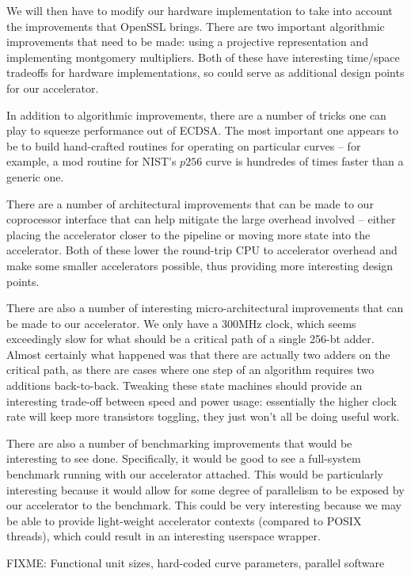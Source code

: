 \documentclass[twocolumn]{article}
\begin{document}
We will then have to modify our hardware implementation to take into
account the improvements that OpenSSL brings.  There are two important
algorithmic improvements that need to be made: using a projective
representation and implementing montgomery multipliers.  Both of these
have interesting time/space tradeoffs for hardware implementations, so
could serve as additional design points for our accelerator.

In addition to algorithmic improvements, there are a number of tricks
one can play to squeeze performance out of ECDSA.  The most important
one appears to be to build hand-crafted routines for operating on
particular curves -- for example, a mod routine for NIST's $p256$
curve is hundredes of times faster than a generic
one\cite{nist-routines}.

There are a number of architectural improvements that can be made to
our coprocessor interface that can help mitigate the large overhead
involved -- either placing the accelerator closer to the pipeline or
moving more state into the accelerator.  Both of these lower the
round-trip CPU to accelerator overhead and make some smaller
accelerators possible, thus providing more interesting design points.

There are also a number of interesting micro-architectural
improvements that can be made to our accelerator.  We only have a
300MHz clock, which seems exceedingly slow for what should be a
critical path of a single 256-bt adder.  Almost certainly what
happened was that there are actually two adders on the critical path,
as there are cases where one step of an algorithm requires two
additions back-to-back.  Tweaking these state machines should provide
an interesting trade-off between speed and power usage: essentially
the higher clock rate will keep more transistors toggling, they just
won't all be doing useful work.

There are also a number of benchmarking improvements that would be
interesting to see done.  Specifically, it would be good to see a
full-system benchmark running with our accelerator attached.  This
would be particularly interesting because it would allow for some
degree of parallelism to be exposed by our accelerator to the
benchmark.  This could be very interesting because we may be able to
provide light-weight accelerator contexts (compared to POSIX threads),
which could result in an interesting userspace wrapper.

FIXME: Functional unit sizes, hard-coded
curve parameters, parallel software
\end{document}
